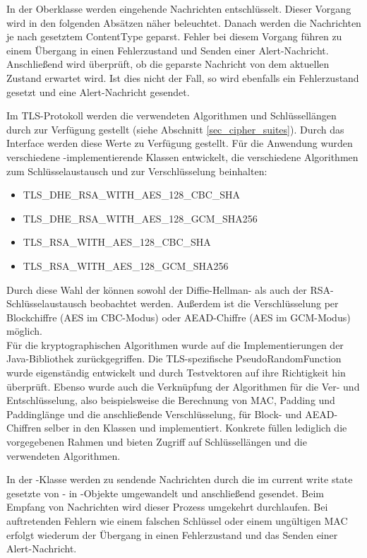 In der Oberklasse  werden eingehende Nachrichten entschlüsselt. Dieser Vorgang wird in den folgenden Absätzen näher beleuchtet. Danach werden die Nachrichten je nach gesetztem ContentType geparst. Fehler bei diesem Vorgang führen zu einem Übergang in einen Fehlerzustand und Senden einer Alert-Nachricht. Anschließend wird überprüft, ob die geparste Nachricht von dem aktuellen Zustand erwartet wird. Ist dies nicht der Fall, so wird ebenfalls ein Fehlerzustand gesetzt und eine Alert-Nachricht gesendet.

Im TLS-Protokoll werden die verwendeten Algorithmen und Schlüssellängen durch \ciphersuites{} zur Verfügung gestellt (siehe Abschnitt \ref{sec_cipher_suites}). Durch das Interface  werden diese Werte zu Verfügung gestellt. Für die Anwendung wurden verschiedene -implementierende Klassen entwickelt, die verschiedene Algorithmen zum Schlüsselaustausch und zur Verschlüsselung beinhalten:
\begin{itemize}
\item TLS\_DHE\_RSA\_WITH\_AES\_128\_CBC\_SHA
\item TLS\_DHE\_RSA\_WITH\_AES\_128\_GCM\_SHA256
\item TLS\_RSA\_WITH\_AES\_128\_CBC\_SHA
\item TLS\_RSA\_WITH\_AES\_128\_GCM\_SHA256
\end{itemize}
Durch diese Wahl der \ciphersuites{} können sowohl der Diffie-Hellman- als auch der RSA-Schlüsselaustausch beobachtet werden. Außerdem ist die Verschlüsselung per Blockchiffre (AES im CBC-Modus) oder AEAD-Chiffre (AES im GCM-Modus) möglich. \\
Für die kryptographischen Algorithmen wurde auf die Implementierungen der Java-Bibliothek zurückgegriffen. Die TLS-spezifische PseudoRandomFunction wurde eigenständig entwickelt und durch Testvektoren auf ihre Richtigkeit hin überprüft. Ebenso wurde auch die Verknüpfung der Algorithmen für die Ver- und Entschlüsselung, also beispielsweise die Berechnung von MAC, Padding und Paddinglänge und die anschließende Verschlüsselung, für Block- und AEAD-Chiffren selber in den Klassen  und  implementiert. Konkrete \ciphersuites{} füllen lediglich die vorgegebenen Rahmen und bieten Zugriff auf Schlüssellängen und die verwendeten Algorithmen.

In der -Klasse werden zu sendende Nachrichten durch die im current write state gesetzte \ciphersuite{} von - in -Objekte umgewandelt und anschließend gesendet. Beim Empfang von Nachrichten wird dieser Prozess umgekehrt durchlaufen. Bei auftretenden Fehlern wie einem falschen Schlüssel oder einem ungültigen MAC erfolgt wiederum der Übergang in einen Fehlerzustand und das Senden einer Alert-Nachricht.

